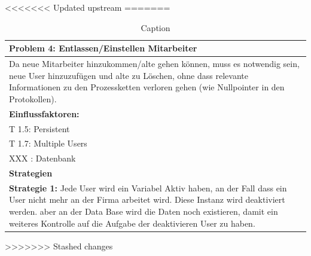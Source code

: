 \documentclass[enabledeprecatedfontcommands,fontsize=12pt,paper=a4,twoside]{scrartcl}
\begin{document}
<<<<<<< Updated upstream
%
=======
\begin{table}[]
    \centering
    \begin{tabular}{|p{15cm}|}
    \hline
          \textbf{Problem 4:} Entlassen/Einstellen Mitarbeiter \\ \hline
          Da neue Mitarbeiter hinzukommen/alte gehen können, muss es notwendig sein, neue User hinzuzufügen und alte zu Löschen, ohne dass relevante Informationen zu den Prozessketten verloren gehen (wie Nullpointer in den Protokollen).
          \\ \hline
          \textbf{Einflussfaktoren: } \\
          T 1.5: Persistent \\
          T 1.7: Multiple Users\\
          XXX : Datenbank \\
          \hline
          \textbf{Strategien} \\ \hline
          \textbf{Strategie 1:} Jede User  wird ein Variabel Aktiv haben, an der Fall dass ein User nicht mehr an der Firma arbeitet wird. Diese Instanz wird deaktiviert werden. aber an der Data Base wird die Daten noch existieren, damit ein weiteres Kontrolle  auf die Aufgabe der deaktivieren User zu haben. 
          \\ \hline
    \end{tabular}

    \caption{Caption}
    \label{tab:my_label}
\end{table}
>>>>>>> Stashed changes
\end{document}
